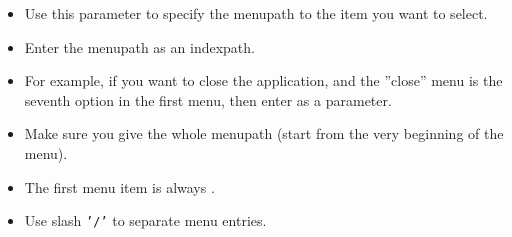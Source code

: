  
\begin{itemize}
\item Use this parameter to specify the menupath to the item you want to select.
\item Enter the menupath as an indexpath.
\item For example, if you want to close the application, and the ''close'' menu is the seventh option in the first menu, then enter  as a parameter.
\item Make sure you give the whole menupath (start from the very beginning of the menu).
\item The first menu item is always . 
\item Use slash {\tt '/'} to separate menu entries.
\end{itemize}




  